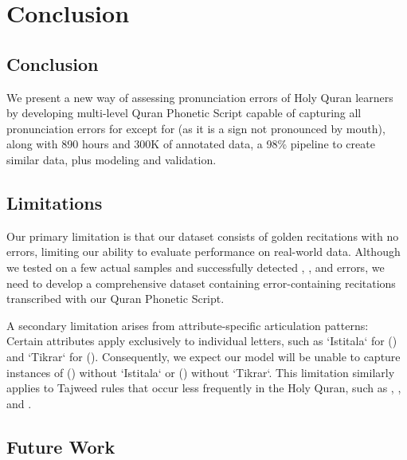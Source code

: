 
\chapter{Conclusion} %

\label{Chapter7} %


\section*{Conclusion}

We present a new way of assessing pronunciation errors of Holy Quran learners by developing multi-level Quran Phonetic Script capable of capturing all pronunciation errors for  except for  (as it is a sign not pronounced by mouth), along with 890 hours and 300K of annotated data, a 98\% pipeline to create similar data, plus modeling and validation.


\section{Limitations}

Our primary limitation is that our dataset consists of golden recitations with no errors, limiting our ability to evaluate performance on real-world data. Although we tested on a few actual samples and successfully detected , , and  errors, we need to develop a comprehensive dataset containing error-containing recitations transcribed with our Quran Phonetic Script.

A secondary limitation arises from attribute-specific articulation patterns: Certain attributes apply exclusively to individual letters, such as `Istitala` for () and `Tikrar` for (). Consequently, we expect our model will be unable to capture instances of () without `Istitala` or () without `Tikrar`. This limitation similarly applies to Tajweed rules that occur less frequently in the Holy Quran, such as , , and .

\section{Future Work}

